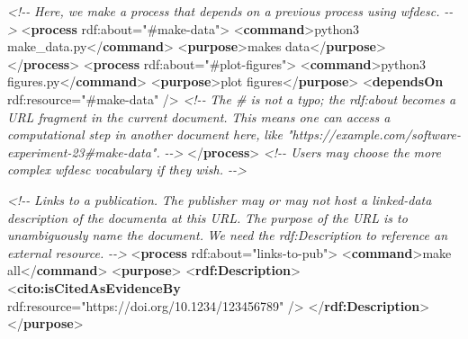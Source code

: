 \documentclass[manuscript]{acmart}
\newenvironment{Shaded}{}{}
\newcommand{\CommentTok}[1]{\textcolor[rgb]{0.38,0.63,0.69}{\textit{#1}}}
\newcommand{\KeywordTok}[1]{\textcolor[rgb]{0.00,0.44,0.13}{\textbf{#1}}}
\newcommand{\NormalTok}[1]{#1}
\newcommand{\OtherTok}[1]{\textcolor[rgb]{0.00,0.44,0.13}{#1}}
\newcommand{\StringTok}[1]{\textcolor[rgb]{0.25,0.44,0.63}{#1}}
\begin{document}
\begin{Shaded}
\begin{Highlighting}[]
  \CommentTok{\textless{}!{-}{-}}
\CommentTok{  Here, we make a process that depends on a previous process using wfdesc.}
\CommentTok{  {-}{-}\textgreater{}}
\NormalTok{  \textless{}}\KeywordTok{process}\OtherTok{ rdf:about=}\StringTok{"\#make{-}data"}\NormalTok{\textgreater{}}
\NormalTok{    \textless{}}\KeywordTok{command}\NormalTok{\textgreater{}python3 make\_data.py\textless{}/}\KeywordTok{command}\NormalTok{\textgreater{}}
\NormalTok{    \textless{}}\KeywordTok{purpose}\NormalTok{\textgreater{}makes data\textless{}/}\KeywordTok{purpose}\NormalTok{\textgreater{}}
\NormalTok{  \textless{}/}\KeywordTok{process}\NormalTok{\textgreater{}}
\NormalTok{  \textless{}}\KeywordTok{process}\OtherTok{ rdf:about=}\StringTok{"\#plot{-}figures"}\NormalTok{\textgreater{}}
\NormalTok{    \textless{}}\KeywordTok{command}\NormalTok{\textgreater{}python3 figures.py\textless{}/}\KeywordTok{command}\NormalTok{\textgreater{}}
\NormalTok{    \textless{}}\KeywordTok{purpose}\NormalTok{\textgreater{}plot figures\textless{}/}\KeywordTok{purpose}\NormalTok{\textgreater{}}
\NormalTok{    \textless{}}\KeywordTok{dependsOn}\OtherTok{ rdf:resource=}\StringTok{"\#make{-}data"}\NormalTok{ /\textgreater{}}
    \CommentTok{\textless{}!{-}{-}}
\CommentTok{    The \# is not a typo; the rdf:about becomes a URL fragment in the current document.}
\CommentTok{    This means one can access a computational step in another document here,}
\CommentTok{    like "https://example.com/software{-}experiment{-}23\#make{-}data".}
\CommentTok{    {-}{-}\textgreater{}}
\NormalTok{  \textless{}/}\KeywordTok{process}\NormalTok{\textgreater{}}
  \CommentTok{\textless{}!{-}{-} Users may choose the more complex wfdesc vocabulary if they wish. {-}{-}\textgreater{}}

  \CommentTok{\textless{}!{-}{-}}
\CommentTok{  Links to a publication.}
\CommentTok{  The publisher may or may not host a linked{-}data description of the documenta at this URL.}
\CommentTok{  The purpose of the URL is to unambiguously name the document.}
\CommentTok{  We need the rdf:Description to reference an external resource.}
\CommentTok{  {-}{-}\textgreater{}}
\NormalTok{  \textless{}}\KeywordTok{process}\OtherTok{ rdf:about=}\StringTok{"links{-}to{-}pub"}\NormalTok{\textgreater{}}
\NormalTok{    \textless{}}\KeywordTok{command}\NormalTok{\textgreater{}make all\textless{}/}\KeywordTok{command}\NormalTok{\textgreater{}}
\NormalTok{    \textless{}}\KeywordTok{purpose}\NormalTok{\textgreater{}}
\NormalTok{      \textless{}}\KeywordTok{rdf:Description}\NormalTok{\textgreater{}}
\NormalTok{        \textless{}}\KeywordTok{cito:isCitedAsEvidenceBy}\OtherTok{ rdf:resource=}\StringTok{"https://doi.org/10.1234/123456789"}\NormalTok{ /\textgreater{}}
\NormalTok{      \textless{}/}\KeywordTok{rdf:Description}\NormalTok{\textgreater{}}
\NormalTok{    \textless{}/}\KeywordTok{purpose}\NormalTok{\textgreater{}}


\end{Highlighting}
\end{Shaded}
\end{document}
